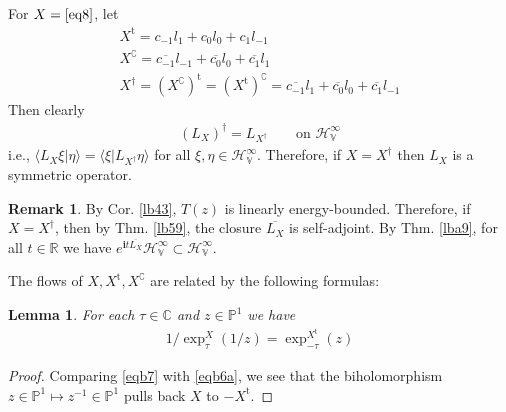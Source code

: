 \documentclass[12pt,b5paper,notitlepage]{article}
\theoremstyle{definition}
\newtheorem{rem}[df]{Remark}
\theoremstyle{plain}
\newtheorem{lm}[df]{Lemma}
\newcommand{\ovl}{\overline}
\newcommand{\tr}{\mathrm{t}} %
\newcommand{\bk}[1]{\langle {#1}\rangle}
\newcommand{\im}{\mathbf{i}}
\newcommand{\Co}{\complement}
\newcommand{\Cbb}{\mathbb C}
\newcommand{\Pbb}{\mathbb P}
\newcommand{\Rbb}{\mathbb R}
\newcommand{\HV}{\mathcal H_{\mathbb V}}
\numberwithin{equation}{section}
\begin{document}
\subsection{}
For $X=\eqref{eq8}$, let
\begin{subequations}\label{eqb6}
\begin{gather}
X^\tr=c_{-1}l_1+c_0l_0+c_1l_{-1}\label{eqb6a}\\
X^\Co=\ovl {c_{-1}}l_{-1}+\ovl{c_0}l_0+\ovl {c_1} l_1\\
 X^\dagger=(X^\Co)^\tr=(X^\tr)^\Co=\ovl {c_{-1}}l_1+\ovl {c_0}l_0+\ovl {c_1} l_{-1}
\end{gather}
\end{subequations}
Then clearly
\begin{align*}
(L_X)^\dagger=L_{X^\dagger}\qquad\text{on $\HV^\infty$}
\end{align*}
i.e., $\bk{L_X\xi|\eta}=\bk{\xi|L_{X^\dagger}\eta}$ for all $\xi,\eta\in\HV^\infty$. Therefore, if $X=X^\dagger$ then $L_X$ is a symmetric operator.

\begin{rem}\label{lb75}
By Cor. \ref{lb43}, $T(z)$ is linearly energy-bounded. Therefore, if $X=X^\dagger$, then by Thm. \ref{lb59}, the closure $\ovl{L_X}$ is self-adjoint. By Thm. \ref{lba9}, for all $t\in\Rbb$ we have $e^{\im t\ovl{L_X}}\HV^\infty\subset\HV^\infty$.
\end{rem}


The flows of  $X,X^\tr,X^\Co$ are related by the following formulas:

\begin{lm}\label{lb73}
For each $\tau\in\Cbb$ and $z\in\Pbb^1$ we have
\begin{align}\label{eqb9}
1/\exp_\tau^X(1/z)=\exp_{-\tau}^{X^\tr}(z)
\end{align}
\end{lm}
\begin{proof}
Comparing \eqref{eqb7} with \eqref{eqb6a}, we see that the biholomorphism $z\in\Pbb^1\mapsto z^{-1}\in\Pbb^1$ pulls back $X$ to $-X^\tr$.
\end{proof}
\end{document}

